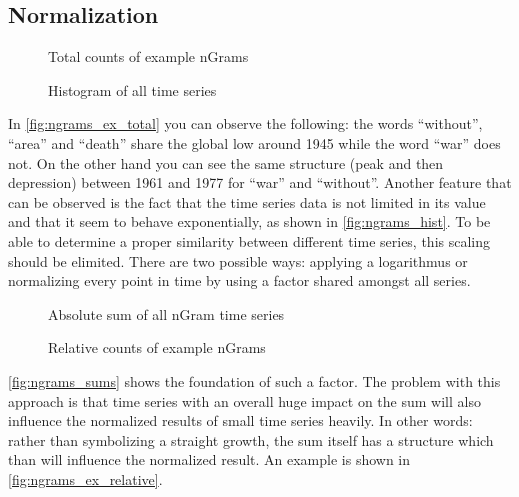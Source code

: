 \subsection{Normalization}
\label{ssec:baseline:sim:norm}

\begin{figure}
    \centering
    
    \caption{Total counts of example nGrams}
    \label{fig:ngrams_ex_total}
\end{figure}

\begin{figure}
    \centering
    
    \caption{Histogram of all time series}
    \label{fig:ngrams_hist}
\end{figure}

In \autoref{fig:ngrams_ex_total} you can observe the following: the words \enquote{without}, \enquote{area} and \enquote{death} share the global low around 1945 while the word \enquote{war} does not. On the other hand you can see the same structure (peak and then depression) between 1961 and 1977 for \enquote{war} and \enquote{without}. Another feature that can be observed is the fact that the time series data is not limited in its value and that it seem to behave exponentially, as shown in \autoref{fig:ngrams_hist}. To be able to determine a proper similarity between different time series, this scaling should be elimited. There are two possible ways: applying a logarithmus or normalizing every point in time by using a factor shared amongst all series.

\begin{figure}
    \centering
    
    \caption{Absolute sum of all nGram time series}
    \label{fig:ngrams_sums}
\end{figure}

\begin{figure}
    \centering
    
    \caption{Relative counts of example nGrams}
    \label{fig:ngrams_ex_relative}
\end{figure}

\autoref{fig:ngrams_sums} shows the foundation of such a factor. The problem with this approach is that time series with an overall huge impact on the sum will also influence the normalized results of small time series heavily. In other words: rather than symbolizing a straight growth, the sum itself has a structure which than will influence the normalized result. An example is shown in \autoref{fig:ngrams_ex_relative}.


